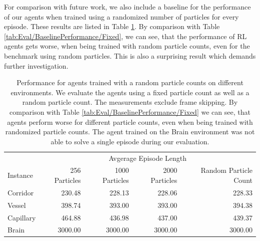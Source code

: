 For comparison with future work, we also include a baseline for the performance of our agents when trained using a randomized number of particles for every episode. These results are listed in Table \ref{tab:Eval/BaselinePerformance/RPC}. By comparison with Table \ref{tab:Eval/BaselinePerformance/Fixed}, we can see, that the performance of RL agents gets worse, when being trained with random particle counts, even for the benchmark using random particles. This is also a surprising result which demands further investigation. 

\begin{table} [htp]
    \begin{center}
        \begin{tabular}{lrrrr}
            \toprule
            & \multicolumn{4}{c}{Avgerage Episode Length} \\
            \cmidrule(lr){2-5}
            Instance & 256 Particles & 1000 Particles & 2000 Particles & Random Particle Count \\
            \midrule
            Corridor & 230.48 & 228.13 & 228.06 & 228.33 \\
            Vessel & 398.74 & 393.00 & 393.00 & 394.38 \\
            Capillary & 464.88 & 436.98 & 437.00 & 439.37 \\
            Brain & 3000.00 & 3000.00 & 3000.00 & 3000.00  \\
            \bottomrule
        \end{tabular}

    \end{center}
    \caption[Baseline Performance for Agents Trained with a Random Particle Counts]{Performance for agents trained with a random particle counts on different environments. We evaluate the agents using a fixed particle count as well as a random particle count. The measurements exclude frame skipping. By comparison with Table \ref{tab:Eval/BaselinePerformance/Fixed} we can see, that agents perform worse for different particle counts, even when being trained with randomized particle counts. The agent trained on the Brain environment was not able to solve a single episode during our evaluation.} \label{tab:Eval/BaselinePerformance/RPC}
\end{table}


